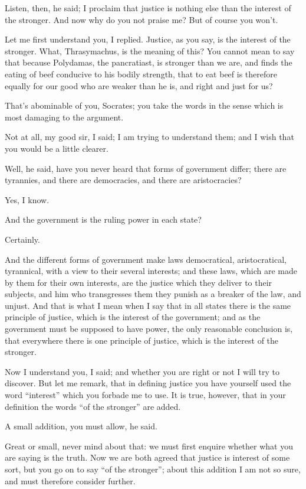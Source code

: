 Listen, then, he said; I proclaim that justice is nothing else than
the interest of the stronger. And now why do you not praise me? But of
course you won't.

Let me first understand you, I replied. Justice, as you say, is the
interest of the stronger. What, Thrasymachus, is the meaning of this?
You cannot mean to say that because Polydamas, the pancratiast, is
stronger than we are, and finds the eating of beef conducive to his
bodily strength, that to eat beef is therefore equally for our good who
are weaker than he is, and right and just for us?

That's abominable of you, Socrates; you take the words in the sense
which is most damaging to the argument.

Not at all, my good sir, I said; I am trying to understand them; and I
wish that you would be a little clearer.

Well, he said, have you never heard that forms of government differ;
there are tyrannies, and there are democracies, and there are
aristocracies?

Yes, I know.

And the government is the ruling power in each state?

Certainly.

And the different forms of government make laws democratical,
aristocratical, tyrannical, with a view to their several interests;
and these laws, which are made by them for their own interests, are the
justice which they deliver to their subjects, and him who transgresses
them they punish as a breaker of the law, and unjust. And that is what
I mean when I say that in all states there is the same principle of
justice, which is the interest of the government; and as the government
must be supposed to have power, the only reasonable conclusion is, that
everywhere there is one principle of justice, which is the interest of
the stronger.

Now I understand you, I said; and whether you are right or not I will
try to discover. But let me remark, that in defining justice you have
yourself used the word ``interest'' which you forbade me to use. It is
true, however, that in your definition the words ``of the stronger'' are
added.

A small addition, you must allow, he said.

Great or small, never mind about that: we must first enquire whether
what you are saying is the truth. Now we are both agreed that justice
is interest of some sort, but you go on to say ``of the stronger''; about
this addition I am not so sure, and must therefore consider further.

